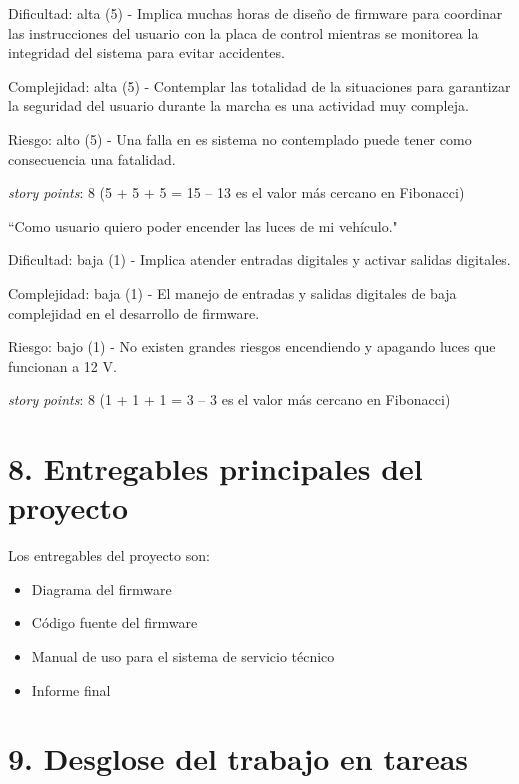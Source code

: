 \documentclass[
11pt, %
codirector, %
]{charter}
\begin{document}
Dificultad: alta (5) - Implica muchas horas de diseño de firmware para coordinar las instrucciones del usuario con la placa de control mientras se monitorea la integridad del sistema para evitar accidentes.

Complejidad: alta (5) - Contemplar las totalidad de la situaciones para garantizar la seguridad del usuario durante la marcha es una actividad muy compleja.

Riesgo: alto (5) - Una falla en es sistema no contemplado puede tener como consecuencia una fatalidad.

\textit{story points}: 8
(5 + 5 + 5 = 15 -- 13 es el valor más cercano en Fibonacci)

``Como usuario quiero poder encender las luces de mi vehículo."

Dificultad: baja (1) - Implica atender entradas digitales y activar salidas digitales.

Complejidad: baja (1) - El manejo de entradas y salidas digitales de baja complejidad en el desarrollo de firmware.

Riesgo: bajo (1) - No existen grandes riesgos encendiendo y apagando luces que funcionan a 12 V.

\textit{story points}: 8
(1 + 1 + 1 = 3 -- 3 es el valor más cercano en Fibonacci)

\section{8. Entregables principales del proyecto}
\label{sec:entregables}

Los entregables del proyecto son:

\begin{itemize}
	\item Diagrama del firmware
	\item Código fuente del firmware
	\item Manual de uso para el sistema de servicio técnico
	\item Informe final
\end{itemize}

\section{9. Desglose del trabajo en tareas}
\label{sec:wbs}
\end{document}
